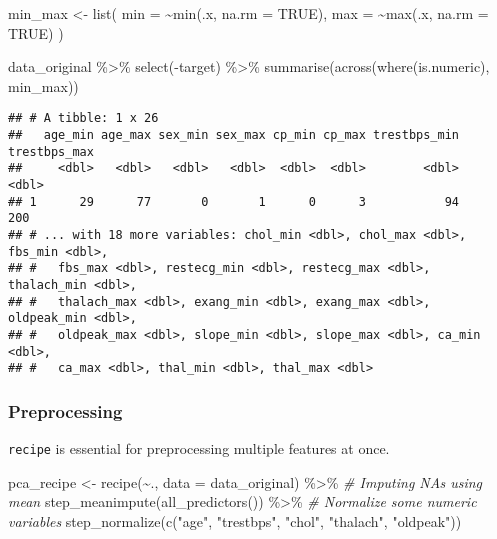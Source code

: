 \documentclass[
]{book}
\newenvironment{Shaded}{\begin{snugshade}}{\end{snugshade}}
\newcommand{\AttributeTok}[1]{\textcolor[rgb]{0.77,0.63,0.00}{#1}}
\newcommand{\CommentTok}[1]{\textcolor[rgb]{0.56,0.35,0.01}{\textit{#1}}}
\newcommand{\ConstantTok}[1]{\textcolor[rgb]{0.00,0.00,0.00}{#1}}
\newcommand{\FunctionTok}[1]{\textcolor[rgb]{0.00,0.00,0.00}{#1}}
\newcommand{\NormalTok}[1]{#1}
\newcommand{\OtherTok}[1]{\textcolor[rgb]{0.56,0.35,0.01}{#1}}
\newcommand{\SpecialCharTok}[1]{\textcolor[rgb]{0.00,0.00,0.00}{#1}}
\newcommand{\StringTok}[1]{\textcolor[rgb]{0.31,0.60,0.02}{#1}}
\begin{document}
\begin{Shaded}
\begin{Highlighting}[]
\NormalTok{min\_max }\OtherTok{\textless{}{-}} \FunctionTok{list}\NormalTok{(}
  \AttributeTok{min =} \SpecialCharTok{\textasciitilde{}}\FunctionTok{min}\NormalTok{(.x, }\AttributeTok{na.rm =} \ConstantTok{TRUE}\NormalTok{), }
  \AttributeTok{max =} \SpecialCharTok{\textasciitilde{}}\FunctionTok{max}\NormalTok{(.x, }\AttributeTok{na.rm =} \ConstantTok{TRUE}\NormalTok{)}
\NormalTok{)}

\NormalTok{data\_original }\SpecialCharTok{\%\textgreater{}\%}
  \FunctionTok{select}\NormalTok{(}\SpecialCharTok{{-}}\NormalTok{target) }\SpecialCharTok{\%\textgreater{}\%}
  \FunctionTok{summarise}\NormalTok{(}\FunctionTok{across}\NormalTok{(}\FunctionTok{where}\NormalTok{(is.numeric), min\_max))}
\end{Highlighting}
\end{Shaded}

\begin{verbatim}
## # A tibble: 1 x 26
##   age_min age_max sex_min sex_max cp_min cp_max trestbps_min trestbps_max
##     <dbl>   <dbl>   <dbl>   <dbl>  <dbl>  <dbl>        <dbl>        <dbl>
## 1      29      77       0       1      0      3           94          200
## # ... with 18 more variables: chol_min <dbl>, chol_max <dbl>, fbs_min <dbl>,
## #   fbs_max <dbl>, restecg_min <dbl>, restecg_max <dbl>, thalach_min <dbl>,
## #   thalach_max <dbl>, exang_min <dbl>, exang_max <dbl>, oldpeak_min <dbl>,
## #   oldpeak_max <dbl>, slope_min <dbl>, slope_max <dbl>, ca_min <dbl>,
## #   ca_max <dbl>, thal_min <dbl>, thal_max <dbl>
\end{verbatim}

\hypertarget{preprocessing}{%
\subsubsection{Preprocessing}\label{preprocessing}}

\texttt{recipe} is essential for preprocessing multiple features at once.

\begin{Shaded}
\begin{Highlighting}[]
\NormalTok{pca\_recipe }\OtherTok{\textless{}{-}} \FunctionTok{recipe}\NormalTok{(}\SpecialCharTok{\textasciitilde{}}\NormalTok{., }\AttributeTok{data =}\NormalTok{ data\_original) }\SpecialCharTok{\%\textgreater{}\%}
  \CommentTok{\# Imputing NAs using mean }
  \FunctionTok{step\_meanimpute}\NormalTok{(}\FunctionTok{all\_predictors}\NormalTok{()) }\SpecialCharTok{\%\textgreater{}\%}
  \CommentTok{\# Normalize some numeric variables }
  \FunctionTok{step\_normalize}\NormalTok{(}\FunctionTok{c}\NormalTok{(}\StringTok{"age"}\NormalTok{, }\StringTok{"trestbps"}\NormalTok{, }\StringTok{"chol"}\NormalTok{, }\StringTok{"thalach"}\NormalTok{, }\StringTok{"oldpeak"}\NormalTok{)) }
\end{Highlighting}
\end{Shaded}
\end{document}
